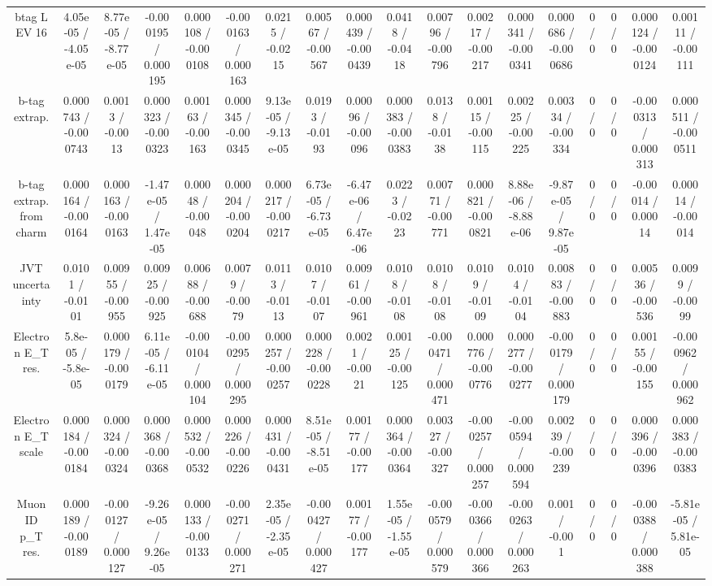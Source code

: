 \documentclass[10pt]{article}
\begin{document}
\begin{table}[htbp]
\begin{center}
\begin{tabular}{|c|c|c|c|c|c|c|c|c|c|c|c|c|c|c|c|c|c|}
  btag L EV 16 & 4.05e-05 / -4.05e-05 & 8.77e-05 / -8.77e-05 & -0.000195 / 0.000195 & 0.000108 / -0.000108 & -0.000163 / 0.000163 & 0.0215 / -0.0215 & 0.00567 / -0.00567 & 0.000439 / -0.000439 & 0.0418 / -0.0418 & 0.00796 / -0.00796 & 0.00217 / -0.00217 & 0.000341 / -0.000341 & 0.000686 / -0.000686 & 0 / 0 & 0 / 0 & 0.000124 / -0.000124 & 0.00111 / -0.00111 \\ 
  b-tag extrap. & 0.000743 / -0.000743 & 0.0013 / -0.0013 & 0.000323 / -0.000323 & 0.00163 / -0.00163 & 0.000345 / -0.000345 & 9.13e-05 / -9.13e-05 & 0.0193 / -0.0193 & 0.00096 / -0.00096 & 0.000383 / -0.000383 & 0.0138 / -0.0138 & 0.00115 / -0.00115 & 0.00225 / -0.00225 & 0.00334 / -0.00334 & 0 / 0 & 0 / 0 & -0.000313 / 0.000313 & 0.000511 / -0.000511 \\ 
  b-tag extrap. from charm & 0.000164 / -0.000164 & 0.000163 / -0.000163 & -1.47e-05 / 1.47e-05 & 0.00048 / -0.00048 & 0.000204 / -0.000204 & 0.000217 / -0.000217 & 6.73e-05 / -6.73e-05 & -6.47e-06 / 6.47e-06 & 0.0223 / -0.0223 & 0.00771 / -0.00771 & 0.000821 / -0.000821 & 8.88e-06 / -8.88e-06 & -9.87e-05 / 9.87e-05 & 0 / 0 & 0 / 0 & -0.00014 / 0.00014 & 0.00014 / -0.00014 \\ 
  JVT uncertainty & 0.0101 / -0.0101 & 0.00955 / -0.00955 & 0.00925 / -0.00925 & 0.00688 / -0.00688 & 0.0079 / -0.0079 & 0.0113 / -0.0113 & 0.0107 / -0.0107 & 0.00961 / -0.00961 & 0.0108 / -0.0108 & 0.0108 / -0.0108 & 0.0109 / -0.0109 & 0.0104 / -0.0104 & 0.00883 / -0.00883 & 0 / 0 & 0 / 0 & 0.00536 / -0.00536 & 0.0099 / -0.0099 \\ 
  Electron E_{T} res. & 5.8e-05 / -5.8e-05 & 0.000179 / -0.000179 & 6.11e-05 / -6.11e-05 & -0.000104 / 0.000104 & -0.000295 / 0.000295 & 0.000257 / -0.000257 & 0.000228 / -0.000228 & 0.0021 / -0.0021 & 0.00125 / -0.00125 & -0.000471 / 0.000471 & 0.000776 / -0.000776 & 0.000277 / -0.000277 & -0.000179 / 0.000179 & 0 / 0 & 0 / 0 & 0.00155 / -0.00155 & -0.000962 / 0.000962 \\ 
  Electron E_{T} scale & 0.000184 / -0.000184 & 0.000324 / -0.000324 & 0.000368 / -0.000368 & 0.000532 / -0.000532 & 0.000226 / -0.000226 & 0.000431 / -0.000431 & 8.51e-05 / -8.51e-05 & 0.00177 / -0.00177 & 0.000364 / -0.000364 & 0.00327 / -0.00327 & -0.000257 / 0.000257 & -0.000594 / 0.000594 & 0.00239 / -0.00239 & 0 / 0 & 0 / 0 & 0.000396 / -0.000396 & 0.000383 / -0.000383 \\ 
  Muon ID p_{T} res. & 0.000189 / -0.000189 & -0.000127 / 0.000127 & -9.26e-05 / 9.26e-05 & 0.000133 / -0.000133 & -0.000271 / 0.000271 & 2.35e-05 / -2.35e-05 & -0.000427 / 0.000427 & 0.00177 / -0.00177 & 1.55e-05 / -1.55e-05 & -0.000579 / 0.000579 & -0.000366 / 0.000366 & -0.000263 / 0.000263 & 0.001 / -0.001 & 0 / 0 & 0 / 0 & -0.000388 / 0.000388 & -5.81e-05 / 5.81e-05 \\ 

\end{tabular}
\end{center}
\end{table}
\end{document}
